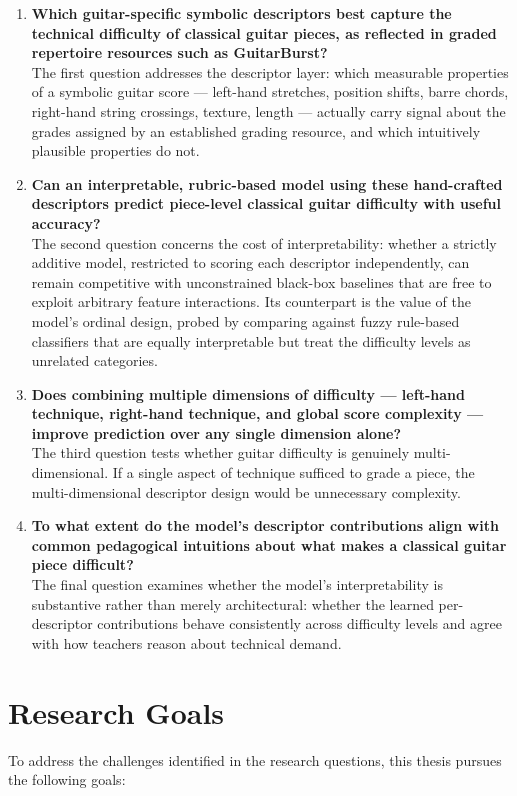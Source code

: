 \begin{enumerate}
    \item \textbf{Which guitar-specific symbolic descriptors best capture the technical difficulty of classical guitar pieces, as reflected in graded repertoire resources such as GuitarBurst?}\\
    The first question addresses the descriptor layer: which measurable properties of a symbolic guitar score --- left-hand stretches, position shifts, barre chords, right-hand string crossings, texture, length --- actually carry signal about the grades assigned by an established grading resource, and which intuitively plausible properties do not.
    \item \textbf{Can an interpretable, rubric-based model using these hand-crafted descriptors predict piece-level classical guitar difficulty with useful accuracy?}\\
    The second question concerns the cost of interpretability: whether a strictly additive model, restricted to scoring each descriptor independently, can remain competitive with unconstrained black-box baselines that are free to exploit arbitrary feature interactions. Its counterpart is the value of the model's ordinal design, probed by comparing against fuzzy rule-based classifiers that are equally interpretable but treat the difficulty levels as unrelated categories.
    \item \textbf{Does combining multiple dimensions of difficulty --- left-hand technique, right-hand technique, and global score complexity --- improve prediction over any single dimension alone?}\\
    The third question tests whether guitar difficulty is genuinely multi-dimensional. If a single aspect of technique sufficed to grade a piece, the multi-dimensional descriptor design would be unnecessary complexity.
    \item \textbf{To what extent do the model's descriptor contributions align with common pedagogical intuitions about what makes a classical guitar piece difficult?}\\
    The final question examines whether the model's interpretability is substantive rather than merely architectural: whether the learned per-descriptor contributions behave consistently across difficulty levels and agree with how teachers reason about technical demand.
\end{enumerate}

\section{Research Goals}
To address the challenges identified in the research questions, this thesis pursues the following goals:

